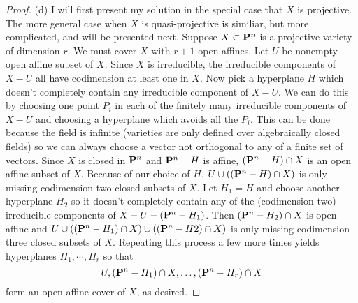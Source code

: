 \documentclass[12pt]{article}
\begin{document}
\begin{proof}
(d) I will first present my solution in the special
case that $X$ is projective. The more general case when $X$ is 
quasi-projective is similiar, but more complicated, and will 
be presented next. 
Suppose $X\subset\P^n$ is a projective variety of dimension $r$. 
We must cover $X$ with $r+1$ open affines. Let $U$ be nonempty
open affine subset of $X$. Since $X$ is irreducible, the irreducible
components of $X-U$ all have codimension at least one in $X$. 
Now pick a hyperplane $H$ which doesn't
completely contain any irreducible component of $X-U$. We can do
this by choosing one point $P_i$ in each of the finitely
many irreducible components of $X-U$ and choosing a hyperplane
which avoids all the $P_i$. This can be done because the field
is infinite (varieties are only defined over algebraically
closed fields) so we can always choose a vector not orthogonal
to any of a finite set of vectors.
Since $X$ is closed in $\P^n$ and $\P^n-H$ is affine, 
$(\P^n-H)\intersect X$ is an open affine subset of $X$.
Because of our choice of $H$, $U\union((\P^n-H)\intersect X)$ is only 
missing codimension two closed subsets of $X$. Let $H_1=H$
and choose another hyperplane $H_2$ so it doesn't completely
contain any of the (codimension two) irreducible components
of $X-U-(\P^n-H_1)$. Then $(\P^n-H_2)\intersect X$ is open
affine and $U\union((\P^n-H_1)\intersect X)\union((\P^n-H2)\intersect X)$  
is only missing codimension three closed subsets of $X$.
Repeating this process a few more times yields 
hyperplanes $H_1,\cdots,H_r$ so that 
$$U, (\P^n-H_1)\intersect X, \ldots, (\P^n-H_r)\intersect X$$ 
form an open affine cover of $X$, as desired.


\end{proof}
\end{document}
